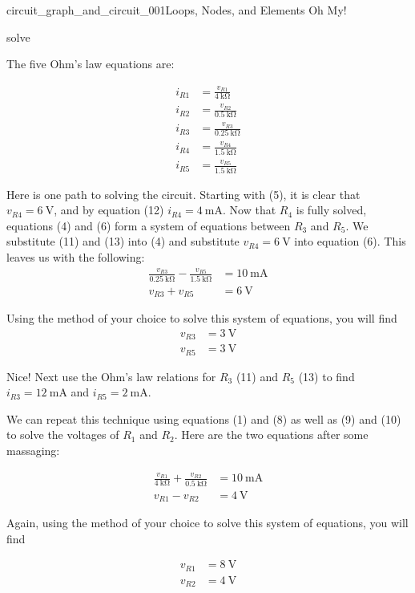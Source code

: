 \begin{mainquestion}{circuit_graph_and_circuit_001}{Loops, Nodes, and Elements Oh My!}
\begin{partquestion}{solve}
\begin{answer}
The five Ohm's law equations are:

\begin{align}
i_{R1} &= \frac{v_{R1}}{\qty{4}{\kilo\ohm}} \\
i_{R2} &= \frac{v_{R2}}{\qty{0.5}{\kilo\ohm}} \\
i_{R3} &= \frac{v_{R3}}{\qty{0.25}{\kilo\ohm}} \\
i_{R4} &= \frac{v_{R4}}{\qty{1.5}{\kilo\ohm}} \\
i_{R5} &= \frac{v_{R5}}{\qty{1.5}{\kilo\ohm}}
\end{align}

Here is one path to solving the circuit. Starting with (5), it is clear that
$v_{R4}=\qty{6}{\volt}$, and by equation (12)
$i_{R4}=\qty{4}{\milli\ampere}$. Now that $R_4$ is fully solved, equations (4) and (6) form a system of equations between $R_3$ and $R_5$. We substitute (11) and (13) into (4) and substitute $v_{R4}=\qty{6}{\volt}$ into equation (6). This leaves us with the following:
\begin{align*}
\frac{v_{R3}}{\qty{0.25}{\kilo\ohm}}
-
\frac{v_{R5}}{\qty{1.5}{\kilo\ohm}}
&=
\qty{10}{\milli\ampere} \\
v_{R3}+v_{R5}
&=
\qty{6}{\volt}
\end{align*}

Using the method of your choice to solve this system of equations, you will find
\begin{align*}
v_{R3} &= \qty{3}{\volt} \\
v_{R5} &= \qty{3}{\volt}
\end{align*}

Nice! Next use the Ohm's law relations for $R_3$ (11) and $R_5$ (13) to find
$i_{R3}=\qty{12}{\milli\ampere}$ and
$i_{R5}=\qty{2}{\milli\ampere}$.

We can repeat this technique using equations (1) and (8) as well as (9) and (10) to solve the voltages of $R_1$ and $R_2$. Here are the two equations after some massaging:

\begin{align*}
\frac{v_{R1}}{\qty{4}{\kilo\ohm}}
+
\frac{v_{R2}}{\qty{0.5}{\kilo\ohm}}
&=
\qty{10}{\milli\ampere} \\
v_{R1}-v_{R2}
&=
\qty{4}{\volt}
\end{align*}

Again, using the method of your choice to solve this system of equations, you will find

\begin{align*}
v_{R1} &= \qty{8}{\volt} \\
v_{R2} &= \qty{4}{\volt}
\end{align*}


\end{answer}
\end{partquestion}
\end{mainquestion}
